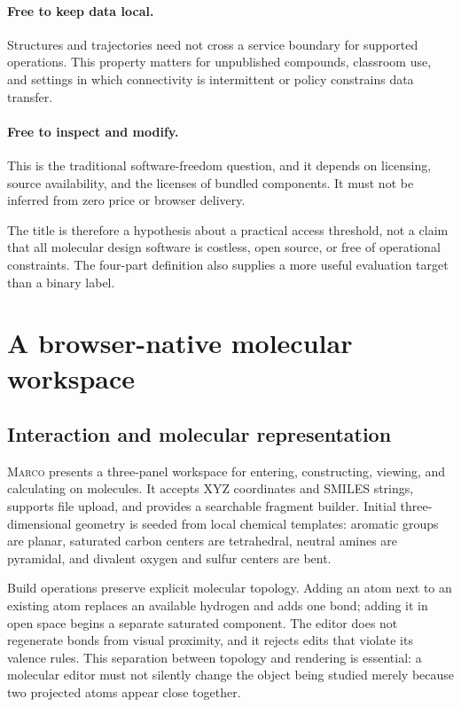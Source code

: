\documentclass[11pt]{article}
\newcommand{\marco}{\textsc{Marco}}
\begin{document}
\paragraph{Free to keep data local.}
Structures and trajectories need not cross a service boundary for supported
operations.
This property matters for unpublished compounds, classroom use, and settings in
which connectivity is intermittent or policy constrains data transfer.

\paragraph{Free to inspect and modify.}
This is the traditional software-freedom question, and it depends on licensing,
source availability, and the licenses of bundled components.
It must not be inferred from zero price or browser delivery.

The title is therefore a hypothesis about a practical access threshold, not a
claim that all molecular design software is costless, open source, or free of
operational constraints.
The four-part definition also supplies a more useful evaluation target than a
binary label.

\section{A browser-native molecular workspace}
\label{sec:system}

\subsection{Interaction and molecular representation}

\marco{} presents a three-panel workspace for entering, constructing, viewing,
and calculating on molecules.
It accepts XYZ coordinates and SMILES strings, supports file upload, and provides
a searchable fragment builder.
Initial three-dimensional geometry is seeded from local chemical templates:
aromatic groups are planar, saturated carbon centers are tetrahedral, neutral
amines are pyramidal, and divalent oxygen and sulfur centers are bent.

Build operations preserve explicit molecular topology.
Adding an atom next to an existing atom replaces an available hydrogen and adds
one bond; adding it in open space begins a separate saturated component.
The editor does not regenerate bonds from visual proximity, and it rejects edits
that violate its valence rules.
This separation between topology and rendering is essential: a molecular editor
must not silently change the object being studied merely because two projected
atoms appear close together.
\end{document}
